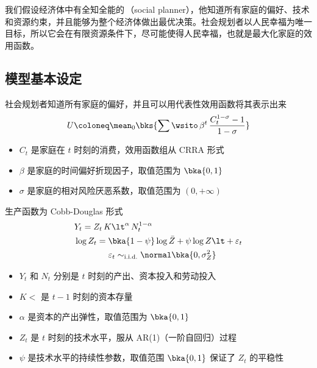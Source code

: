 我们假设经济体中有全知全能的\,（social planner），他知道所有家庭的偏好、技术和资源约束，并且能够为整个经济体做出最优决策。社会规划者以人民幸福为唯一目标，所以它会在有限资源条件下，尽可能使得人民幸福，也就是最大化家庭的效用函数。

\subsection{模型基本设定}\label{subsec:BasicSetup}


社会规划者知道所有家庭的偏好，并且可以用代表性效用函数将其表示出来
\begin{align}
    U\coloneq \mean_0\bks{\sum\wsito \,\beta^t\,\dfrac{C_t^{1-\sigma}-1}{1-\sigma}}
\end{align}
\begin{itemize}
    \item \(C_t\) 是家庭在 \(t\) 时刻的消费，效用函数组从 CRRA 形式
    \item \(\beta\) 是家庭的时间偏好折现因子，取值范围为 \(\bka{0,1}\)
    \item \(\sigma\) 是家庭的相对风险厌恶系数，取值范围为 \((0,+\infty)\)
\end{itemize}


生产函数为 Cobb-Douglas 形式
\begin{align}
    &Y_t=Z_t\,K\lt^\alpha\,N_t^{1-\alpha}\\
    &\log Z_t=\bka{1-\psi}\log\bar Z+\psi\log Z\lt+\varepsilon_t\\
    &\qquad\qquad \varepsilon_t\sim_\text{i.i.d.}\normal\bka{0,\sigma^2_Z}\notag
\end{align}
\begin{itemize}
    \item \(Y_t\) 和 \(N_t\) 分别是 \(t\) 时刻的产出、资本投入和劳动投入
    \item \(K\lt\) 是 \(t-1\) 时刻的资本存量
    \item \(\alpha\) 是资本的产出弹性，取值范围为 \(\bka{0,1}\)
    \item \(Z_t\) 是 \(t\) 时刻的技术水平，服从 AR(1)（一阶自回归）过程
    \item \(\psi\) 是技术水平的持续性参数，取值范围 \(\bka{0,1}\) 保证了 \(Z_t\) 的平稳性
\end{itemize}

